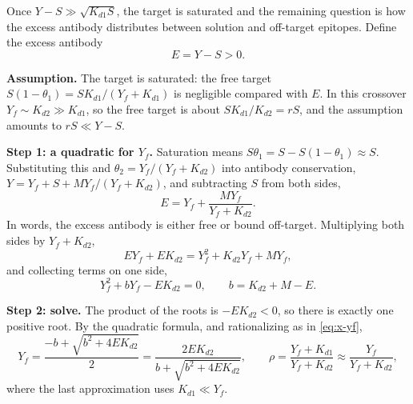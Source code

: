 Once $Y-S\gg\sqrt{K_{d1}S}$, the target is saturated and the remaining
question is how the excess antibody distributes between solution and
off-target epitopes. Define the excess antibody
$$
E=Y-S>0.
$$

\textbf{Assumption.} The target is saturated: the free target
$S(1-\theta_1)=SK_{d1}/(Y_f+K_{d1})$ is negligible compared with $E$. In this
crossover $Y_f\sim K_{d2}\gg K_{d1}$, so the free target is about
$SK_{d1}/K_{d2}=rS$, and the assumption amounts to $rS\ll Y-S$.

\textbf{Step 1: a quadratic for $Y_f$.} Saturation means
$S\theta_1=S-S(1-\theta_1)\approx S$. Substituting this and
$\theta_2=Y_f/(Y_f+K_{d2})$ into antibody conservation,
$Y=Y_f+S+MY_f/(Y_f+K_{d2})$, and subtracting $S$ from both sides,
$$
E=Y_f+\frac{MY_f}{Y_f+K_{d2}}.
$$
In words, the excess antibody is either free or bound off-target.
Multiplying both sides by $Y_f+K_{d2}$,
$$
EY_f+EK_{d2}=Y_f^2+K_{d2}Y_f+MY_f,
$$
and collecting terms on one side,
\begin{equation}
Y_f^2+bY_f-EK_{d2}=0,
\qquad
b=K_{d2}+M-E.
\label{eq:x-quad-c}
\end{equation}

\textbf{Step 2: solve.} The product of the roots is $-EK_{d2}<0$, so there
is exactly one positive root. By the quadratic formula, and rationalizing
as in \eqref{eq:x-yf},
\begin{equation}
Y_f
=\frac{-b+\sqrt{b^2+4EK_{d2}}}{2}
=\frac{2EK_{d2}}{b+\sqrt{b^2+4EK_{d2}}},
\qquad
\rho=\frac{Y_f+K_{d1}}{Y_f+K_{d2}}\approx\frac{Y_f}{Y_f+K_{d2}},
\label{eq:x-yf-c}
\end{equation}
where the last approximation uses $K_{d1}\ll Y_f$.

